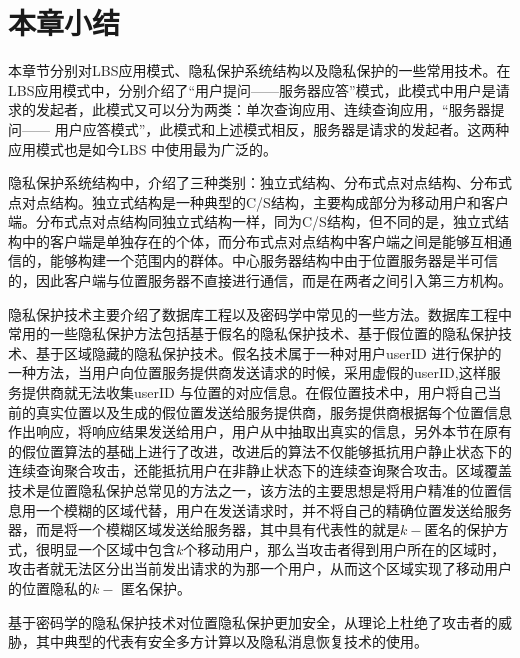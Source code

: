 \section{本章小结}
本章节分别对LBS应用模式、隐私保护系统结构以及隐私保护的一些常用技术。在LBS应用模式中，分别介绍了“用户提问——服务器应答”模式，此模式中用户是请求的发起者，此模式又可以分为两类：单次查询应用、连续查询应用，“服务器提问—— 用户应答模式”，此模式和上述模式相反，服务器是请求的发起者。这两种应用模式也是如今LBS 中使用最为广泛的。

隐私保护系统结构中，介绍了三种类别：独立式结构、分布式点对点结构、分布式点对点结构。独立式结构是一种典型的C/S结构，主要构成部分为移动用户和客户端。分布式点对点结构同独立式结构一样，同为C/S结构，但不同的是，独立式结构中的客户端是单独存在的个体，而分布式点对点结构中客户端之间是能够互相通信的，能够构建一个范围内的群体。中心服务器结构中由于位置服务器是半可信的，因此客户端与位置服务器不直接进行通信，而是在两者之间引入第三方机构。

隐私保护技术主要介绍了数据库工程以及密码学中常见的一些方法。数据库工程中常用的一些隐私保护方法包括基于假名的隐私保护技术、基于假位置的隐私保护技术、基于区域隐藏的隐私保护技术。假名技术属于一种对用户userID 进行保护的一种方法，当用户向位置服务提供商发送请求的时候，采用虚假的userID,这样服务提供商就无法收集userID 与位置的对应信息。在假位置技术中，用户将自己当前的真实位置以及生成的假位置发送给服务提供商，服务提供商根据每个位置信息作出响应，将响应结果发送给用户，用户从中抽取出真实的信息，另外本节在原有的假位置算法的基础上进行了改进，改进后的算法不仅能够抵抗用户静止状态下的连续查询聚合攻击，还能抵抗用户在非静止状态下的连续查询聚合攻击。区域覆盖技术是位置隐私保护总常见的方法之一，该方法的主要思想是将用户精准的位置信息用一个模糊的区域代替，用户在发送请求时，并不将自己的精确位置发送给服务器，而是将一个模糊区域发送给服务器，其中具有代表性的就是$k-$匿名的保护方式，很明显一个区域中包含$k$个移动用户，那么当攻击者得到用户所在的区域时，攻击者就无法区分出当前发出请求的为那一个用户，从而这个区域实现了移动用户的位置隐私的$k-$ 匿名保护。

基于密码学的隐私保护技术对位置隐私保护更加安全，从理论上杜绝了攻击者的威胁，其中典型的代表有安全多方计算以及隐私消息恢复技术的使用。


